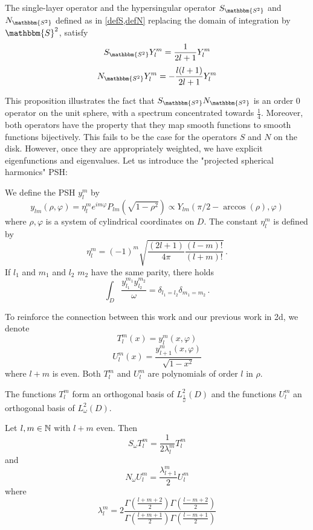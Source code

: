 \documentclass[]{article}
\begin{document}
\begin{Prop}
	The single-layer operator and the hypersingular operator $S_{\mathbbm{S^2}}$ and $N_{\mathbbm{S^2}}$ defined as in \cref{defS,defN} replacing the domain of integration by $\mathbbm{S}^2$, satisfy
	\[S_{\mathbbm{S^2}} Y_{l}^m = \frac{1}{2l+1} Y_l^m\]
	\[N_{\mathbbm{S^2}} Y_{l}^m = -\frac{l(l+1)}{2l + 1} Y_l^m\]
\end{Prop}
This proposition illustrates the fact that $S_{\mathbbm{S^2}}N_{\mathbbm{S^2}}$ is an order $0$ operator on the unit sphere, with a spectrum concentrated towards $\frac{1}{4}$. Moreover, both operators have the property that they map smooth functions to smooth functions bijectively. This fails to be the case for the operators $S$ and $N$ on the disk. However, once they are appropriately weighted, we have explicit eigenfunctions and eigenvalues. Let us introduce the "projected spherical harmonics" PSH:
\begin{Def}
	We define the PSH $y_{l}^m$ by 
	\[y_{lm}(\rho,\varphi) = \eta_{l}^m e^{im \varphi} P_{lm}(\sqrt{1 - \rho^2}) \propto Y_{lm}(\pi/2 - \arccos(\rho),\varphi)\]
	where $\rho,\varphi$ is a system of cylindrical coordinates on $D$. The constant $\eta_{l}^m$ is defined by 
	\[\eta_{l}^m = (-1)^m \sqrt{\frac{(2l+1)}{4\pi}\frac{(l-m)!}{(l+m)!}}\,.\]
	If $l_1$ and $m_1$ and $l_2$ $m_2$ have the same parity, there holds 
	\[\int_{D} \frac{y_{l_1}^{m_1}y_{l_2}^{m_2}}{\omega} = \delta_{l_1 = l_2}\delta_{m_1 = m_2}\,.\]
\end{Def}

\begin{Def}
	To reinforce the connection between this work and our previous work in 2d, we denote 
	\[T_{l}^m(x) = y_{l}^m(x,\varphi)\] 
	\[U_{l}^m(x) = \frac{y_{l+1}^m(x,\varphi)}{\sqrt{1 - x^2}}\]
	where $l+m$ is even.
	Both $T_{l}^m$ and $U_{l}^m$ are polynomials of order $l$ in $\rho$. 
\end{Def}
\begin{Prop}
	The functions $T_{l}^m$ form an orthogonal basis of $L^2_\frac{1}{\omega}(D)$ and the functions $U_{l}^m$ an orthogonal basis of $L^2_\omega(D)$. 
\end{Prop}
\begin{Prop}
	Let $l,m \in \mathbb{N}$ with $l + m$ even. Then
	\[S_\omega T_{l}^m = \frac{1}{2\lambda_{l}^m} T_{l}^m \]
	and 
	\[N_\omega U_{l}^m = \frac{\lambda_{l+1}^m}{2} U_{l}^m\]
	where
	\[\lambda_{l}^m = 2\frac{\Gamma\left(\frac{l+m+2}{2}\right) \Gamma\left(\frac{l-m+2}{2}\right)}{\Gamma\left(\frac{l+m+1}{2}\right) \Gamma\left(\frac{l-m+1}{2}\right)}\]
\end{Prop}
\end{document}
